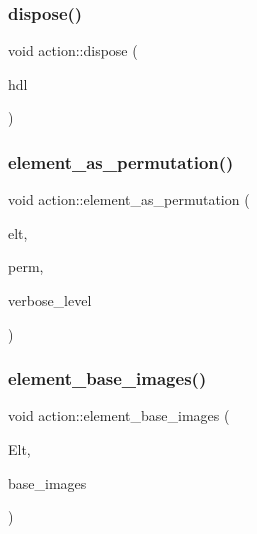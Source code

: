 \mbox{\label{classaction_a1aed4d044abc871e19ed256581ce61e6}} 
\subsubsection{\texorpdfstring{dispose()}{dispose()}}
{\footnotesize\ttfamily void action\+::dispose (\begin{DoxyParamCaption}\item[{\mbox{\hyperlink{galois_8h_a09fddde158a3a20bd2dcadb609de11dc}{I\+NT}}}]{hdl }\end{DoxyParamCaption})}

\mbox{\label{classaction_a2594aa11d6ac99d94e7cbcb4f9d81ccc}} 
\subsubsection{\texorpdfstring{element\+\_\+as\+\_\+permutation()}{element\_as\_permutation()}}
{\footnotesize\ttfamily void action\+::element\+\_\+as\+\_\+permutation (\begin{DoxyParamCaption}\item[{void $\ast$}]{elt,  }\item[{\mbox{\hyperlink{galois_8h_a09fddde158a3a20bd2dcadb609de11dc}{I\+NT}} $\ast$}]{perm,  }\item[{\mbox{\hyperlink{galois_8h_a09fddde158a3a20bd2dcadb609de11dc}{I\+NT}}}]{verbose\+\_\+level }\end{DoxyParamCaption})}

\mbox{\label{classaction_afd647915ce11b6ce42455e33999dd822}} 
\subsubsection{\texorpdfstring{element\+\_\+base\+\_\+images()}{element\_base\_images()}}
{\footnotesize\ttfamily void action\+::element\+\_\+base\+\_\+images (\begin{DoxyParamCaption}\item[{\mbox{\hyperlink{galois_8h_a09fddde158a3a20bd2dcadb609de11dc}{I\+NT}} $\ast$}]{Elt,  }\item[{\mbox{\hyperlink{galois_8h_a09fddde158a3a20bd2dcadb609de11dc}{I\+NT}} $\ast$}]{base\+\_\+images }\end{DoxyParamCaption})}

